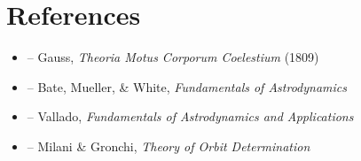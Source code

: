 \section{References}

\begin{itemize}
    \item \cite{gauss-theoria} -- Gauss, \textit{Theoria Motus Corporum Coelestium} (1809)
    \item \cite{bate-mueller-white} -- Bate, Mueller, \& White, \textit{Fundamentals of Astrodynamics}
    \item \cite{vallado} -- Vallado, \textit{Fundamentals of Astrodynamics and Applications}
    \item \cite{milani-gronchi} -- Milani \& Gronchi, \textit{Theory of Orbit Determination}
\end{itemize}